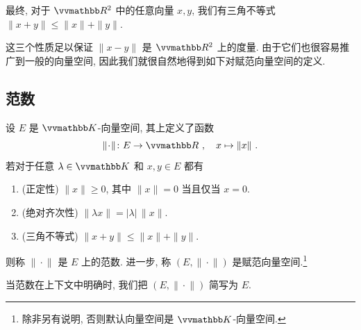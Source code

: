 最终, 对于 \(\R^2\) 中的任意向量 \(x, y\), 我们有三角不等式 \(\|x + y\| \leq \|x\| + \|y\|\).

\begin{center}
\end{center}

这三个性质足以保证 \(\|x - y\|\) 是 \(\R^2\) 上的度量. 由于它们也很容易推广到一般的向量空间, 因此我们就很自然地得到如下对赋范向量空间的定义.

\subsection{范数}

\begin{axiom}[范数]\label{ax:norm}
    设 \(E\) 是 \(\K\)-向量空间, 其上定义了函数
    \[
        \|\!\cdot\!\| \colon E \to \R\ ,\quad x \mapsto \|x\|\ .
    \]
    若对于任意 \(\lambda \in \K\) 和 \(x, y \in E\) 都有
    \begin{enumerate}[label={\((\mathrm N_{\arabic*})\)}]
        \item (正定性) \(\|x\| \geq 0\), 其中 \(\|x\| = 0\) 当且仅当 \(x = 0\).
        \item (绝对齐次性) \(\|\lambda x\| = |\lambda|\, \|x\|\).
        \item (三角不等式) \(\|x + y\| \leq \|x\| + \|y\|\).
    \end{enumerate}
    则称 \(\|\!\cdot\!\|\) 是 \(E\) 上的范数. 进一步, 称 \((E, \|\!\cdot\!\|)\) 是赋范向量空间.\footnote{除非另有说明, 否则默认向量空间是 \(\K\)-向量空间.}
\end{axiom}

当范数在上下文中明确时, 我们把 \((E, \|\!\cdot\!\|)\) 简写为 \(E\).

